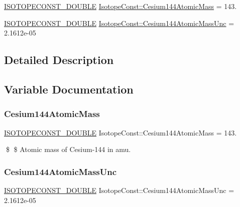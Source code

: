 \begin{DoxyCompactItemize}
\item 
\mbox{\hyperlink{group___isotope_const-_macros_ga8f45a7272ce02c0b4c65c44636ed719a}{I\+S\+O\+T\+O\+P\+E\+C\+O\+N\+S\+T\+\_\+\+D\+O\+U\+B\+LE}} \mbox{\hyperlink{group___isotope_const-_cesium-_cs144_ga4b35596243ea3c8b8997fb45ec68063a}{Isotope\+Const\+::\+Cesium144\+Atomic\+Mass}} = 143.
\item 
\mbox{\hyperlink{group___isotope_const-_macros_ga8f45a7272ce02c0b4c65c44636ed719a}{I\+S\+O\+T\+O\+P\+E\+C\+O\+N\+S\+T\+\_\+\+D\+O\+U\+B\+LE}} \mbox{\hyperlink{group___isotope_const-_cesium-_cs144_ga6074f5e979aa9f713e11e25073ad415d}{Isotope\+Const\+::\+Cesium144\+Atomic\+Mass\+Unc}} = 2.\+1612e-\/05
\end{DoxyCompactItemize}


\subsection{Detailed Description}


\subsection{Variable Documentation}
\mbox{\label{group___isotope_const-_cesium-_cs144_ga4b35596243ea3c8b8997fb45ec68063a}} 
\subsubsection{\texorpdfstring{Cesium144\+Atomic\+Mass}{Cesium144AtomicMass}}
{\footnotesize\ttfamily \mbox{\hyperlink{group___isotope_const-_macros_ga8f45a7272ce02c0b4c65c44636ed719a}{I\+S\+O\+T\+O\+P\+E\+C\+O\+N\+S\+T\+\_\+\+D\+O\+U\+B\+LE}} Isotope\+Const\+::\+Cesium144\+Atomic\+Mass = 143.}

\$ \$ Atomic mass of Cesium-\/144 in amu. \mbox{\label{group___isotope_const-_cesium-_cs144_ga6074f5e979aa9f713e11e25073ad415d}} 
\subsubsection{\texorpdfstring{Cesium144\+Atomic\+Mass\+Unc}{Cesium144AtomicMassUnc}}
{\footnotesize\ttfamily \mbox{\hyperlink{group___isotope_const-_macros_ga8f45a7272ce02c0b4c65c44636ed719a}{I\+S\+O\+T\+O\+P\+E\+C\+O\+N\+S\+T\+\_\+\+D\+O\+U\+B\+LE}} Isotope\+Const\+::\+Cesium144\+Atomic\+Mass\+Unc = 2.\+1612e-\/05}

